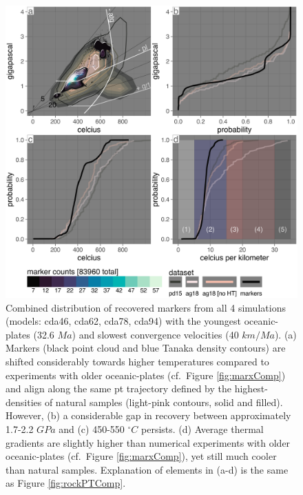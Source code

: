 \begin{figure}[htbp]

{\centering \includegraphics[width=1\linewidth,]{assets/figs/chpt4/marx_comp_young_slow} 

}

\caption[Recovery rates for all 4 subduction simulations with the youngest oceanic-plates and slowest convergence velocities]{Combined distribution of recovered markers from all 4 simulations (models: cda46, cda62, cda78, cda94) with the youngest oceanic-plates (32.6 \(Ma\)) and slowest convergence velocities (40 \(km/Ma\)). (a) Markers (black point cloud and blue Tanaka density contours) are shifted considerably towards higher temperatures compared to experiments with older oceanic-plates (cf.~Figure \ref{fig:marxComp}) and align along the same \gls{pt} trajectory defined by the highest-densities of natural samples (light-pink contours, solid and filled). However, (b) a considerable gap in recovery between approximately 1.7-2.2 \(GPa\) and (c) 450-550 \(^\circ C\) persists. (d) Average thermal gradients are slightly higher than numerical experiments with older oceanic-plates (cf.~Figure \ref{fig:marxComp}), yet still much cooler than natural samples. Explanation of elements in (a-d) is the same as Figure \ref{fig:rockPTComp}.}\label{fig:youngSlow}
\end{figure}

